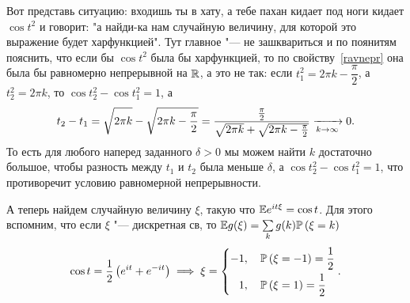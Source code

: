 \documentclass[../TV&MS.tex]{subfiles}
\begin{document}
\begin{Ex}
    Вот представь ситуацию: входишь ты в хату, а тебе пахан кидает под ноги
    кидает $\cos t^2$ и говорит: "а найди-ка нам случайную величину, для 
    которой это выражение будет харфункцией". Тут главное "--- не зашквариться
    и по поянитям пояснить, что если бы $\cos t^2$ была бы харфункцией, то по
    свойству~\eqref{ravnepr} она была бы равномерно непрерывной на $\mathbb{R}$,
    а это не так: если $t_1^2 = 2\pi k - \dfrac{\pi}{2}$, а $t_2^2 = 2\pi k$,
    то $\cos t_2^2 - \cos t_1^2 = 1$, а
    \[
        t_2 - t_1 =\sqrt{\vphantom{\frac{\pi}{2}} 2\pi k} - \sqrt{2\pi k - \frac{\pi}{2} } = 
        \frac{\frac{\pi}{2}}{\sqrt{\vphantom{\frac{\pi}{2}} 2\pi k} + \sqrt{2\pi k - \frac{\pi}{2} }}
        \xrightarrow[k \rightarrow \infty]{} 0 
    .\]
    То есть для любого наперед заданного $\delta > 0$ мы можем найти $k$
    достаточно большое, чтобы разность между $t_1$ и $t_2$ была меньше
    $\delta$, а $\cos t_2^2 - \cos t_1^2 = 1$, что противоречит условию 
    равномерной непрерывности.
\end{Ex}

\begin{Ex}
    А теперь найдем случайную величину $\xi$, такую что $\mathbb{E} e^{it\xi} = \cos t$.
    Для этого вспомним, что если $\xi$ "--- дискретная св, то 
    $\mathbb{E} g(\xi) = \sum\limits_{k} g(k) \mathbb{P} \left( \xi = k \right)  $
    \[
        \cos t = \frac{1}{2} \left( e^{it} + e^{-it} \right)
        \implies \xi = 
        \left\{
            \begin{aligned}
                -1 &, \quad \mathbb{P}\left(\xi = -1\right) = \frac{1}{2} \\
                1 &, \quad \mathbb{P} \left( \xi = 1 \right) = \frac{1}{2}
            \end{aligned}
        \right. 
    .\] 
\end{Ex} 

\newpage
\end{document}
